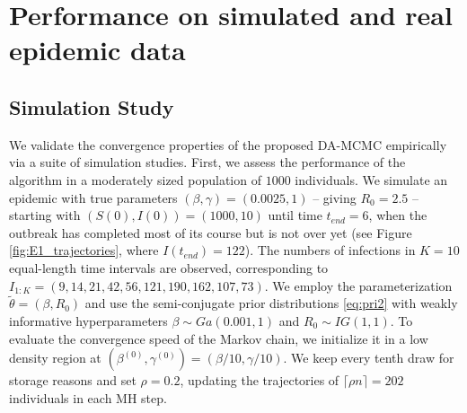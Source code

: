 \documentclass[11pt]{article}
\begin{document}
	
	\section{Performance on simulated and real epidemic data}
	\label{sec:per}
	
	\subsection{Simulation Study}
	\label{sec:sim}
	
	We validate the convergence properties of the proposed DA-MCMC empirically via a suite of simulation studies. First, we assess the performance of the algorithm in a moderately sized population of $1000$ individuals. We simulate an epidemic with true parameters $(\beta, \gamma) = (0.0025, 1)$ -- giving $R_0 = 2.5$ -- starting with $(S(0), I(0)) = (1000, 10)$ until time $t_{end} = 6$, when the outbreak has completed most of its course but is not over yet (see Figure \ref{fig:E1_trajectories}, where $I(t_{end}) = 122$). The numbers of infections in $K = 10$ equal-length time intervals are observed, corresponding to $I_{1:K} = (9, 14, 21, 42, 56, 121, 190, 162, 107, 73)$.	
	We employ the parameterization $\tilde{\theta} = (\beta, R_0)$ and use the semi-conjugate prior distributions \eqref{eq:pri2} with weakly informative hyperparameters $\beta \sim Ga(0.001, 1)$ and $R_0 \sim IG(1,1)$.
	To evaluate the convergence speed of the Markov chain, we initialize it in a low density region at $\left(\beta^{(0)}, \gamma^{(0)}\right) = \left(\beta/10, \gamma/10\right)$. We keep every tenth draw for storage reasons and set $\rho = 0.2$, updating the trajectories of $\lceil\rho n\rceil = 202$ individuals in each MH step.
	
\end{document}
